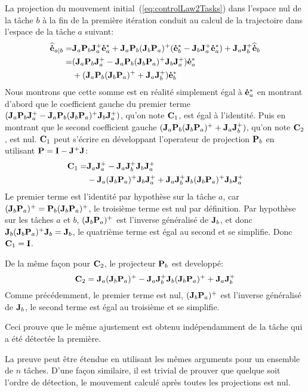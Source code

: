La projection du mouvement initial~(\ref{eq:controlLaw2Tasks}) dans l'espace nul de
la t\^ache $b$ à la fin de la première itération conduit au calcul de la trajectoire 
dans l'espace de la t\^ache $a$ suivant:
\begin{align*}
{\mathbf{\widehat{\dot{e}}}}_{a|b} =& {\mathbf{J}}_{a} {\mathbf{P}}_{b} {\mathbf{J}}_{a}^+ {\mathbf{\dot{e}}}_{a}^* +
 {\mathbf{J}}_{a} {\mathbf{P}}_{b} ({\mathbf{J}}_{b} {\mathbf{P}}_{a} )^+ ( {\mathbf{\dot{e}}}_{b}^* - {\mathbf{J}}_{b} {\mathbf{J}}_{a}^+ {\mathbf{\dot{e}}}_{a}^*)
+ {\mathbf{J}}_{a} {\mathbf{J}}_{b}^+ {\mathbf{\widehat{\dot{e}}}}_{b} \\
=& ({\mathbf{J}}_{a} {\mathbf{P}}_{b} {\mathbf{J}}_{a}^+ - {\mathbf{J}}_{a} {\mathbf{P}}_{b} ({\mathbf{J}}_{b} {\mathbf{P}}_{a} )^+ {\mathbf{J}}_{b} {\mathbf{J}}_{a}^+) {\mathbf{\dot{e}}}_{a}^* \\
&+ ({\mathbf{J}}_{a} {\mathbf{P}}_{b} ({\mathbf{J}}_{b} {\mathbf{P}}_{a} )^+ + {\mathbf{J}}_{a} {\mathbf{J}}_{b}^+) {\mathbf{\dot{e}}}_{b}^*
\end{align*}
Nous montrons que cette somme est en réalité simplement égal à ${\mathbf{\dot{e}}}_{a}^*$
en montrant d'abord que le coefficient gauche du premier terme 
$({\mathbf{J}}_{a} {\mathbf{P}}_{b} {\mathbf{J}}_{a}^+ - {\mathbf{J}}_{a} {\mathbf{P}}_{b} ({\mathbf{J}}_{b} {\mathbf{P}}_{a} )^+ {\mathbf{J}}_{b} {\mathbf{J}}_{a}^+)$, 
qu'on note ${\mathbf{C}}_1$, est égal à l'identité.
Puis en montrant que le second coefficient gauche $({\mathbf{J}}_{a} {\mathbf{P}}_{b} ({\mathbf{J}}_{b} {\mathbf{P}}_{a} )^+ + {\mathbf{J}}_{a} {\mathbf{J}}_{b}^+)$,
qu'on note ${\mathbf{C}}_2$, est nul.
${\mathbf{C}}_1$ peut s'écrire en développant l'operateur 
de projection ${\mathbf{P}}_{b}$ en utilisant ${\mathbf{P}} = {\mathbf{I}} - {\mathbf{J}}^+ {\mathbf{J}}$:
\begin{align*}
{\mathbf{C}}_1 =& {\mathbf{J}}_{a} {\mathbf{J}}_{a}^+ -   {\mathbf{J}}_{a} {\mathbf{J}}_{b}^+ {\mathbf{J}}_{b} {\mathbf{J}}_{a}^+ \\
&- {\mathbf{J}}_{a} ({\mathbf{J}}_{b} {\mathbf{P}}_{a} )^+ {\mathbf{J}}_{b} {\mathbf{J}}_{a}^+  + {\mathbf{J}}_{a} {\mathbf{J}}_{b}^+ {\mathbf{J}}_{b} ({\mathbf{J}}_{b} {\mathbf{P}}_{a} )^+ {\mathbf{J}}_{b} {\mathbf{J}}_{a}^+
\end{align*}
Le premier terme est l'identité par hypothèse sur la t\^ache $a$, car
$({\mathbf{J}}_{b} {\mathbf{P}}_{a} )^+ = {\mathbf{P}}_{b}({\mathbf{J}}_{b} {\mathbf{P}}_{a} )^+$, le troisième terme est nul par définition. 
Par hypothèse sur les t\^aches $a$ et $b$, $({\mathbf{J}}_{b} {\mathbf{P}}_{a} )^+$ 
est l'inverse généralisé de ${\mathbf{J}}_{b}$, et donc ${\mathbf{J}}_{b} ({\mathbf{J}}_{b} {\mathbf{P}}_{a} )^+ {\mathbf{J}}_{b} = {\mathbf{J}}_{b}$,
le quatrième terme est égal au second et se simplifie. Donc ${\mathbf{C}}_1 = {\mathbf{I}}$.

De la même façon pour ${\mathbf{C}}_2$, le projecteur ${\mathbf{P}}_{b}$ est developpé:
\[
{\mathbf{C}}_2 = {\mathbf{J}}_{a} ({\mathbf{J}}_{b} {\mathbf{P}}_{a} )^+ - {\mathbf{J}}_{a} {\mathbf{J}}_{b}^+{\mathbf{J}}_{b} ({\mathbf{J}}_{b} {\mathbf{P}}_{a} )^+ + {\mathbf{J}}_{a} {\mathbf{J}}_{b}^+
\]
Comme précédemment, le premier terme est nul, $({\mathbf{J}}_{b} {\mathbf{P}}_{a} )^+$ 
est l'inverse généralisé de ${\mathbf{J}}_{b}$, le second terme est égal au troisième et se simplifie.

Ceci prouve que le même ajustement est obtenu indépendamment de la t\^ache qui a été
détectée la première. ~\QED 


\medskip
La preuve peut \^etre étendue en utilisant les m\^emes arguments 
pour un ensemble de $n$ t\^aches.
D'une façon similaire, il est trivial de prouver que quelque soit l'ordre
de détection, le mouvement calculé après toutes les projections est nul.

